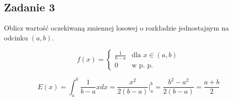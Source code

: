 \subsection{Zadanie 3}

Oblicz wartość oczekiwaną zmiennej losowej o rozkładzie jednostajnym na odcinku $(a,b)$.

$$
f(x)
 = \left\{ \begin{array}{ll}
 \frac{1}{b-a} & \textrm{dla $x\in(a,b)$}\\
0 & \textrm{w p. p.}
\end{array} \right.
$$
  
$$
E(x) =  \int_{a}^{b} \frac{1}{b-a} x dx = \frac{x^2}{2(b-a)}\Bigg|^{b}_{a}  = \frac{b^2 - a^2}{2(b-a)} = \frac{a+b}{2}
$$
